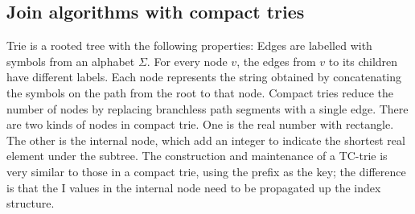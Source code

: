 \subsection{Join algorithms with compact tries}

 Trie is a rooted tree with the following properties: Edges are labelled with symbols from an alphabet $\Sigma$. For every node $v$, the edges from $v$ to its children have different labels. Each node represents the string obtained by concatenating the symbols on the path from the root to that node. Compact tries reduce the number of nodes by replacing branchless path segments with a single edge. There are two kinds of nodes in compact trie. One is the real number with rectangle. The other is the internal node, which add an integer to indicate the shortest real element under the subtree. The construction and maintenance of a TC-trie is very similar to those in a compact trie, using the prefix as the key; the difference is that the I values in the internal node need to be propagated up the index structure.









